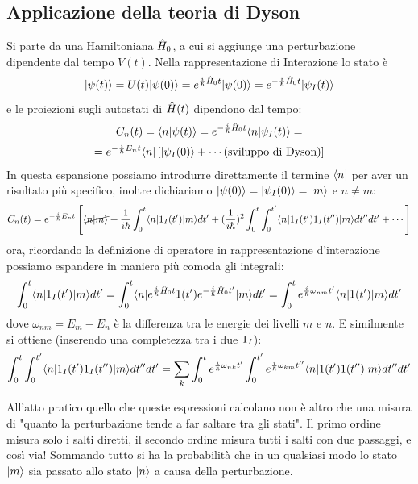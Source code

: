\subsection{Applicazione della teoria di Dyson}
Si parte da una Hamiltoniana $\H_0$, a cui si aggiunge una perturbazione dipendente dal tempo $V(t)$. Nella rappresentazione di Interazione lo stato è
\[
	\Ket{\psi(t)} = \\U(t)\Ket {\psi(0)} = e^{\frac{i}{\hslash} \H_0 t} \Ket{\psi(0)} = e^{-\frac{i}{\hslash} \H_0 t} \Ket{\psi_I(t)}
\]
e le proiezioni sugli autostati di $\H(t)$ dipendono dal tempo:
\begin{gather*}
	C_n(t) = \braket{n} {\psi(t)} = e^{-\frac{i}{\hslash} \H_0 t} \braket{n} {\psi_I(t)} = \\
	= e^{-\frac{i}{\hslash} E_n t} \Bra{n} \left[ \Ket{\psi_I(0)} + \cdots (\text{sviluppo di Dyson}) \right]
\end{gather*}
In questa espansione possiamo introdurre direttamente il termine $\Bra n$ per aver un risultato più specifico, inoltre dichiariamo $\Ket {\psi{(0)}} = \Ket {\psi_I(0)} = \Ket m$ e $n \neq m$:
\[
	C_n(t) = e^{-\frac{i}{\hslash} E_n t} \left[ \cancel{\braket{n}{m}} + \frac{1}{i\h} \tint \braketin{n}{\V_I(t')}{m} dt' + (\frac{1}{i\h})^2 \tint \tint[t'] \braketin{n}{\V_I(t')\V_I(t'')}{m} dt'' dt' + \cdots \right]
\]
ora, ricordando la definizione di operatore in rappresentazione d'interazione possiamo espandere in maniera più comoda gli integrali:
\[
	\tint \braketin{n}{\V_I(t')}{m} dt' = \tint \braketin{n}{e^{\frac{i}{\hslash} \H_0 t}\V(t') e^{-\frac{i}{\hslash} \H_0 t'}}{m} dt' = \tint e^{\frac{i}{\hslash} \omega_{nm} t'} \braketin{n}{\V(t')}{m} dt'
\]
dove $\omega_{nm} = E_m - E_n$ è la differenza tra le energie dei livelli $m$ e $n$. E similmente si ottiene (inserendo una completezza tra i due $\V_I$):
\[
	\tint \tint[t'] \braketin{n}{\V_I(t')\V_I(t'')}{m} dt'' dt' = \sum_{k} \tint e^{\frac{i}{\hslash} \omega_{nk} t'} \tint[t'] e^{\frac{i}{\hslash} \omega_{km} t''} \braketin{n}{\V(t')\V(t'')}{m} dt'' dt'
\]

All'atto pratico quello che queste espressioni calcolano non è altro che una misura di "quanto la perturbazione tende a far saltare tra gli stati". Il primo ordine misura solo i salti diretti, il secondo ordine misura tutti i salti con due passaggi, e così via! Sommando tutto si ha la probabilità che in un qualsiasi modo lo stato $\Ket m$ sia passato allo stato $\Ket n$ a causa della perturbazione.
